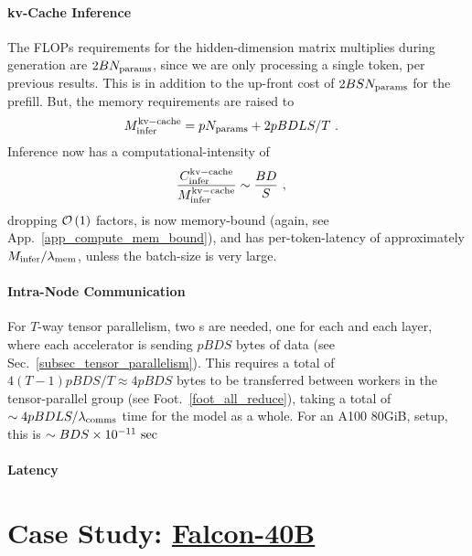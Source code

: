 \documentclass[11pt]{article}
\begin{document}
\paragraph{kv-Cache Inference}
The FLOPs requirements for the hidden-dimension matrix multiplies during generation are $2BN _{ {\rm params}  } $,
since we are only processing a single token, per previous results.   This is in addition to the up-front cost of $ 2BSN _{
			{\rm params}} $ for the prefill. But, the memory requirements are raised to
\begin{align}
	M _{ {\rm infer}  }^{ {\rm kv-cache}  } & =pN _{ {\rm params}  } + 2pBDLS/T\ .
\end{align}
Inference now has a computational-intensity of
\begin{align}
	\frac{ C _{ {\rm infer} } ^{ {\rm kv-cache} } }{ M _{ {\rm infer}  }^{ {\rm kv-cache}  } } & \sim \frac{ BD }{ S } \ ,
\end{align}
dropping $ \mathcal{O} \left( 1 \right)  $ factors, is now memory-bound (again, see
App.~\ref{app_compute_mem_bound}), and has per-token-latency of approximately $ M _{ {\rm infer} }/
	\lambda _{ {\rm mem} }$, unless the batch-size is very large.


\paragraph{Intra-Node Communication} For $ T $-way tensor parallelism, two s are
needed, one for each  and each  layer, where each
accelerator is sending $ pBDS  $ bytes of data (see Sec.~\ref{subsec_tensor_parallelism}). This
requires a total of $ 4\left ( T-1 \right ) pBDS/T \approx 4pBDS $ bytes to be transferred between
workers in the tensor-parallel group (see Foot.~\ref{foot_all_reduce}), taking a total of $ \sim  4pBDLS/
	\lambda _{ {\rm comms} }  $ time for the model as a whole. For an A100 80GiB,  setup, this is $ \sim
	BDS \times  10 ^{ -11 } \ {\rm sec} $


\paragraph{Latency}



\section{Case Study: \href{https://huggingface.co/tiiuae/falcon-40b-instruct?_sm_vck=j230jZ2ssDkkPfJTfRt6tjQNTQZJ65N7VDWmj5Ff6f3jZ3mhh2Pq}{Falcon-40B}}
\end{document}
